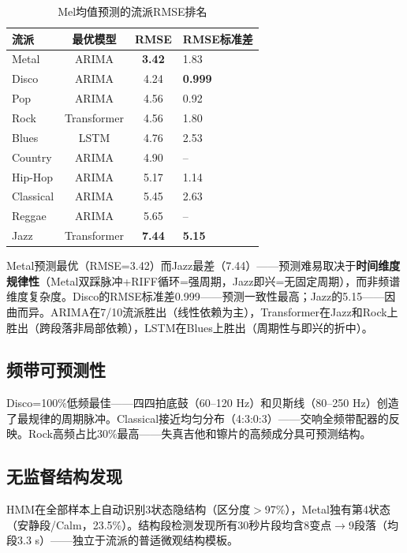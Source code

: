 \documentclass[12pt,a4paper]{article}
\begin{document}
\begin{table}[htbp]
    \centering
    \caption{Mel均值预测的流派RMSE排名}
    \label{tab:pred_rank}
    \small
    \begin{tabularx}{\textwidth}{lccX}
        \toprule
        \textbf{流派} & \textbf{最优模型} & \textbf{RMSE} & \textbf{RMSE标准差} \\
        \midrule
        Metal & ARIMA & \textbf{3.42} & 1.83 \\
        Disco & ARIMA & 4.24 & \textbf{0.999} \\
        Pop & ARIMA & 4.56 & 0.92 \\
        Rock & Transformer & 4.56 & 1.80 \\
        Blues & LSTM & 4.76 & 2.53 \\
        Country & ARIMA & 4.90 & -- \\
        Hip-Hop & ARIMA & 5.17 & 1.14 \\
        Classical & ARIMA & 5.45 & 2.63 \\
        Reggae & ARIMA & 5.65 & -- \\
        Jazz & Transformer & \textbf{7.44} & \textbf{5.15} \\
        \bottomrule
    \end{tabularx}
\end{table}

Metal预测最优（RMSE=3.42）而Jazz最差（7.44）——预测难易取决于\textbf{时间维度规律性}（Metal双踩脉冲+RIFF循环=强周期，Jazz即兴=无固定周期），而非频谱维度复杂度。Disco的RMSE标准差0.999——预测一致性最高；Jazz的5.15——因曲而异。ARIMA在7/10流派胜出（线性依赖为主），Transformer在Jazz和Rock上胜出（跨段落非局部依赖），LSTM在Blues上胜出（周期性与即兴的折中）。

\subsection{频带可预测性}

Disco=100\%低频最佳——四四拍底鼓（60--120 Hz）和贝斯线（80--250 Hz）创造了最规律的周期脉冲。Classical接近均匀分布（4:3:0:3）——交响全频带配器的反映。Rock高频占比30\%最高——失真吉他和镲片的高频成分具可预测结构。

\FloatBarrier
\subsection{无监督结构发现}

HMM在全部样本上自动识别3状态隐结构（区分度$>$97\%），Metal独有第4状态（安静段/Calm，23.5\%）。结构段检测发现所有30秒片段均含8变点$\to$9段落（均段3.3 s）——独立于流派的普适微观结构模板。
\end{document}

